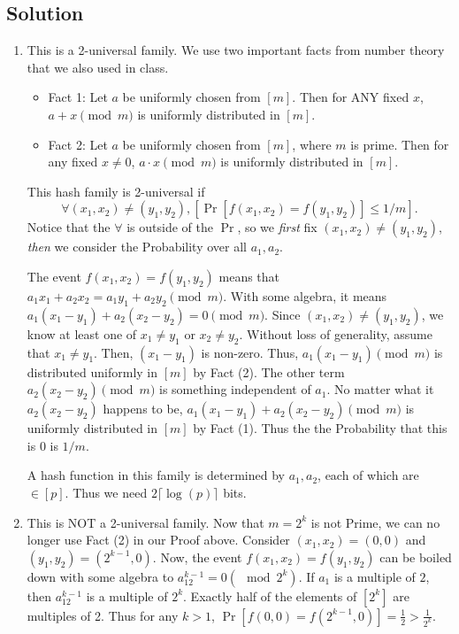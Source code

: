 \documentclass{article}
\begin{document}
\subsection*{Solution}
\begin{enumerate}[label=(\alph*)]
  \item This is a 2-universal family.
    We use two important facts from number theory that we also used in class.
    \begin{itemize}
      \item Fact 1: Let $a$ be uniformly chosen from $[m]$. Then for ANY fixed
        $x$, $a + x \pmod m$ is uniformly distributed in $[m]$.
      \item Fact 2: Let $a$ be uniformly chosen from $[m]$, where $m$ is prime.
        Then for any fixed $x \neq 0$, $a\cdot x \pmod m$ is
        uniformly distributed in $[m]$.
    \end{itemize}

    This hash family is 2-universal if $$\forall (x_1,x_2) \neq (y_1,y_2), 
    \left[\Pr[f(x_1,x_2) = f(y_1,y_2)] \leq 1/m\right].$$
    Notice that the $\forall$ is outside of the $\Pr$, so we
    \emph{first} fix $(x_1,x_2)\neq (y_1,y_2)$, \emph{then} we consider the
    Probability over all $a_1,a_2$.

    The event $f(x_1,x_2) = f(y_1,y_2)$ means that
    $a_1x_1 + a_2x_2 = a_1y_1 + a_2y_2 \pmod m$. With some algebra, it means
    $a_1(x_1 - y_1) + a_2(x_2 - y_2) = 0 \pmod m$.
    Since $(x_1,x_2) \neq (y_1,y_2)$, we know at least one of $x_1\neq y_1$ or
    $x_2 \neq y_2$. Without loss of generality, assume that $x_1 \neq y_1$.
    Then, $(x_1 - y_1)$ is non-zero. Thus, $a_1(x_1 - y_1) \pmod m$ is
    distributed uniformly in $[m]$ by Fact (2).
    The other term $a_2(x_2 - y_2) \pmod m$ is something independent of
    $a_1$. No matter what it $a_2(x_2 - y_2)$ happens to be,
    $a_1(x_1 - y_1) + a_2(x_2 - y_2) \pmod m$ is
    uniformly distributed in $[m]$ by Fact (1). Thus the the Probability that
    this is $0$ is $1/m$.

    A hash function in this family is determined by $a_1,a_2$, each of which
    are $\in [p]$. Thus we need $2\lceil\log(p)\rceil$ bits.

  \item This is NOT a 2-universal family.
    Now that $m = 2^k$ is not Prime, we can no longer use Fact (2) in our Proof
    above.
    Consider $(x_1,x_2) = (0,0)$ and $(y_1,y_2) = (2^{k-1},0)$. Now, the event
    $f(x_1,x_2) = f(y_1,y_2)$ can be boiled down with some algebra to
    $a_12^{k-1} = 0 (\mod 2^k)$. If $a_1$ is a multiple of $2$, then $a_12^{k-1}$
    is a multiple of $2^k$. Exactly half of the elements of $[2^k]$ are
    multiples of 2.
    Thus for any $k > 1$, $\Pr[f(0,0) = f(2^{k-1},0)]=\frac{1}{2} > \frac{1}{2^k}$.


\end{enumerate}
\end{document}
